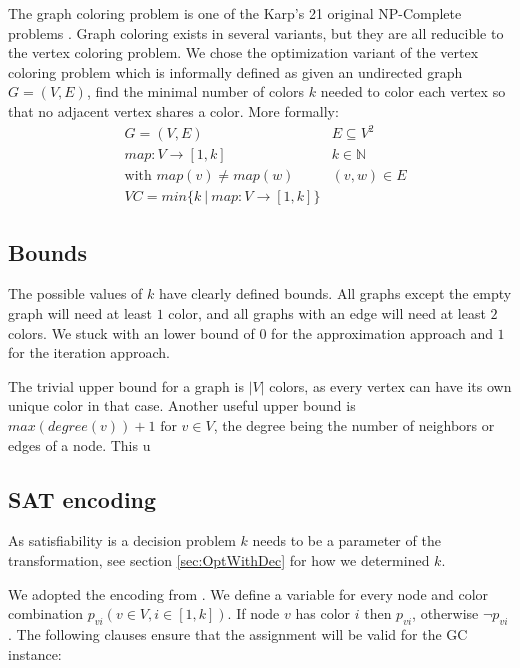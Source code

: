 \documentclass{sig-alternate}
\begin{document}
The graph coloring problem is one of the Karp's 21 original NP-Complete problems \cite{karp1972reducibility}.
Graph coloring exists in several variants, but they are all reducible to the vertex coloring problem.
We chose the optimization variant of the vertex coloring problem which is informally defined as given an undirected graph $G = (V,E)$, find the minimal number of colors $k$ needed to color each vertex so that no adjacent vertex shares a color.
More formally:
\begin{subequations}
\begin{align*}
        & G = (V,E) & E \subseteq V^2\\
        & map : V \rightarrow [1,k] & k \in \mathbb{N} \\
        & \text{with } map(v) \neq map(w) & (v,w) \in E \\
        & VC = min\{k \ | \  map : V \rightarrow [1,k]\}
\end{align*}
\end{subequations}

\subsection{Bounds}

The possible values of $k$ have clearly defined bounds.
All graphs except the empty graph will need at least $1$ color, and all graphs with an edge will need at least $2$ colors.
We stuck with an lower bound of $0$ for the approximation approach and $1$ for the iteration approach.

The trivial upper bound for a graph is $|V|$ colors, as every vertex can have its own unique color in that case.
Another useful upper bound is $max(degree(v))+1 \text{ for } v \in V$, the degree being the number of neighbors or edges of a node.
This u

\subsection{SAT encoding}

As satisfiability is a decision problem $k$ needs to be a parameter of the transformation, see section \ref{sec:OptWithDec} for how we determined $k$.

We adopted the encoding from \cite{cs395tGCtoSAT}.
We define a variable for every node and color combination $p_{vi} (v \in V, i \in [1,k])$.
If node $v$ has color $i$ then $p_{vi}$, otherwise $\neg p_{vi}$.
The following clauses ensure that the assignment will be valid for the GC instance:
\end{document}
